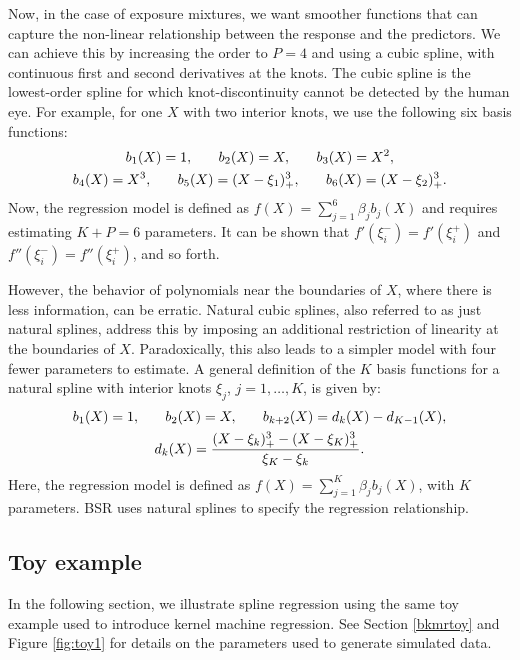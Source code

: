 \documentclass[12pt, twoside]{amherstthesis}
\begin{document}
Now, in the case of exposure mixtures, we want smoother functions that can capture the non-linear relationship between the response and the predictors. We can achieve this by increasing the order to \(P=4\) and using a cubic spline, with continuous first and second derivatives at the knots. The cubic spline is the lowest-order spline for which knot-discontinuity cannot be detected by the human eye. For example, for one \(X\) with two interior knots, we use the following six basis functions:
\begin{gather*}
b_1(X)=1, \hspace{0.25in}b_2(X)=X, \hspace{0.25in}b_3(X)=X^2, \\
b_4(X)=X^3, \hspace{0.25in} b_5(X)=(X-\xi_1)^3_+, \hspace{0.25in} b_6(X)=(X-\xi_2)^3_+.
\end{gather*}
\noindent Now, the regression model is defined as \(f(X)= \sum_{j=1}^6\beta_jb_j(X)\) and requires estimating \(K+P=6\) parameters. It can be shown that \(f'(\xi_i^-)= f'(\xi_i^+)\) and \(f''(\xi_i^-)= f''(\xi_i^+)\), and so forth.

However, the behavior of polynomials near the boundaries of \(X\), where there is less information, can be erratic. Natural cubic splines, also referred to as just natural splines, address this by imposing an additional restriction of linearity at the boundaries of \(X\). Paradoxically, this also leads to a simpler model with four fewer parameters to estimate. A general definition of the \(K\) basis functions for a natural spline with interior knots \(\xi_j\), \(j=1,\dots,K\), is given by:
\begin{gather*}
b_1(X)=1, \hspace{0.25in} b_2(X)=X, \hspace{0.25in} b_{k+2}(X)=d_k(X)-d_{K-1}(X), \\
d_k(X)=\frac{(X-\xi_k)^3_+ - (X-\xi_K)^3_+}{\xi_K-\xi_k}.
\end{gather*}
\noindent Here, the regression model is defined as \(f(X) = \sum_{j=1}^K\beta_jb_j(X)\), with \(K\) parameters. BSR uses natural splines to specify the regression relationship.

\hypertarget{toy-example}{%
\subsection{Toy example}\label{toy-example}}

In the following section, we illustrate spline regression using the same toy example used to introduce kernel machine regression. See Section \ref{bkmrtoy} and Figure \ref{fig:toy1} for details on the parameters used to generate simulated data.
\end{document}
